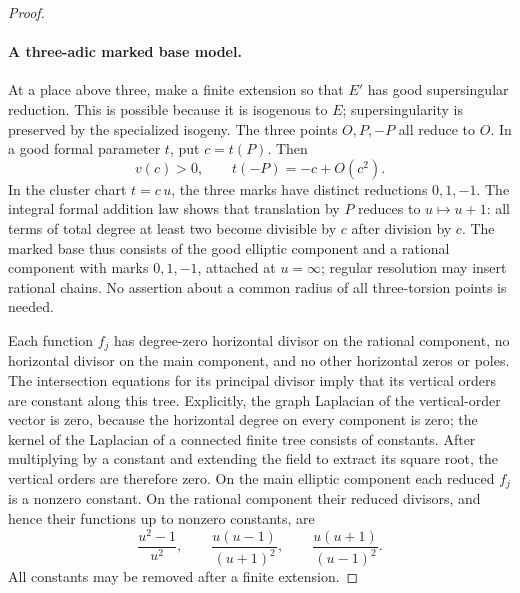 \begin{proof}
\paragraph{A three-adic marked base model.}
At a place above three, make a finite extension so that \(E'\)
has good supersingular reduction. This is possible because it
is isogenous to \(E\); supersingularity is preserved by the
specialized isogeny. The three points \(O,P,-P\) all reduce to
\(O\). In a good formal parameter \(t\), put \(c=t(P)\). Then
\[
 v(c)>0,\qquad t(-P)=-c+O(c^2).
                                                               \tag{A.67.17}
\]
In the cluster chart \(t=c\,u\), the three marks have distinct
reductions \(0,1,-1\). The integral formal addition law shows
that translation by \(P\) reduces to \(u\mapsto u+1\):
all terms of total degree at least two become divisible by
\(c\) after division by \(c\). The marked base thus consists of
the good elliptic component and a rational component with
marks \(0,1,-1\), attached at \(u=\infty\); regular resolution
may insert rational chains. No assertion about a common
radius of all three-torsion points is needed.

Each function \(f_j\) has degree-zero horizontal divisor on
the rational component, no horizontal divisor on the main
component, and no other horizontal zeros or poles. The
intersection equations for its principal divisor imply that
its vertical orders are constant along this tree. Explicitly,
the graph Laplacian of the vertical-order vector is zero,
because the horizontal degree on every component is zero;
the kernel of the Laplacian of a connected finite tree consists
of constants. After multiplying by a constant and extending
the field to extract its square root, the vertical orders
are therefore zero. On the main elliptic component each
reduced \(f_j\) is a nonzero constant. On the rational
component their reduced divisors, and hence their functions
up to nonzero constants, are
\[
 \frac{u^2-1}{u^2},\qquad
 \frac{u(u-1)}{(u+1)^2},\qquad
 \frac{u(u+1)}{(u-1)^2}.
                                                               \tag{A.67.18}
\]
All constants may be removed after a finite extension.


\end{proof}
